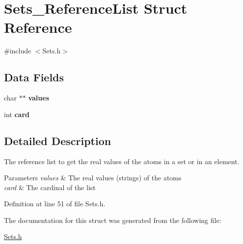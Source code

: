 \hypertarget{struct_sets___reference_list}{
\section{Sets\_\-ReferenceList Struct Reference}
\label{struct_sets___reference_list}
}


{\ttfamily \#include $<$Sets.h$>$}

\subsection*{Data Fields}
\begin{DoxyCompactItemize}
\item 
\hypertarget{struct_sets___reference_list_ada2188333c6f540ad9cbe7c0e17003db}{
char $\ast$$\ast$ {\bfseries values}}
\label{struct_sets___reference_list_ada2188333c6f540ad9cbe7c0e17003db}

\item 
\hypertarget{struct_sets___reference_list_acd789e381a684163a021e2d228653afd}{
int {\bfseries card}}
\label{struct_sets___reference_list_acd789e381a684163a021e2d228653afd}

\end{DoxyCompactItemize}


\subsection{Detailed Description}
The reference list to get the real values of the atoms in a set or in an element. 
\begin{DoxyParams}{Parameters}
{\em values} & The real values (strings) of the atoms \\
\hline
{\em card} & The cardinal of the list \\
\hline
\end{DoxyParams}


Definition at line 51 of file Sets.h.



The documentation for this struct was generated from the following file:\begin{DoxyCompactItemize}
\item 
\hyperlink{_sets_8h}{Sets.h}\end{DoxyCompactItemize}
